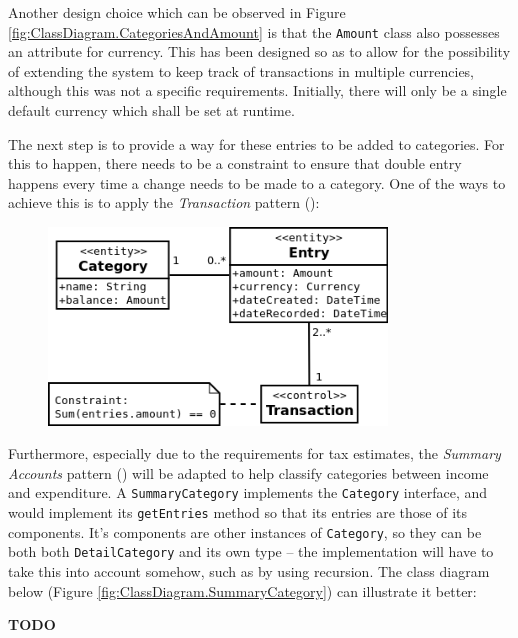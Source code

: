Another design choice which can be observed in Figure
\ref{fig:ClassDiagram.CategoriesAndAmount} is that the \texttt{Amount} class
also possesses an attribute for currency. This has been designed so as to allow
for the possibility of extending the system to keep track of transactions in
multiple currencies, although this was not a specific requirements. Initially,
there will only be a single default currency which shall be set at runtime.

The next step is to provide a way for these entries to be added to categories.
For this to happen, there needs to be a constraint to ensure that double entry
happens every time a change needs to be made to a category. One of the ways to
achieve this is to apply the \emph{Transaction} pattern
(\cite[][Section~6.2]{fowler1997analysis}):
\begin{figure}[ht!]
  \begin{center}
    \includegraphics[width=9cm]{./contents/img/Class_Diagram_-_Transaction.png}
  \end{center}
  \caption{}
  \label{fig:ClassDiagram.Transaction}
\end{figure}
\FloatBarrier


Furthermore, especially due to the requirements for tax estimates, the
\emph{Summary Accounts} pattern (\cite[][Section~6.3]{fowler1997analysis}) will
be adapted to help classify categories between income and expenditure. A
\texttt{SummaryCategory} implements the \texttt{Category} interface, and would
implement its \texttt{getEntries} method so that its entries are those of its
components. It's components are other instances of \texttt{Category}, so they
can be both both \texttt{DetailCategory} and its own type -- the implementation
will have to take this into account somehow, such as by using recursion. The
class diagram below (Figure \ref{fig:ClassDiagram.SummaryCategory}) can
illustrate it better:

\textbf{TODO}

